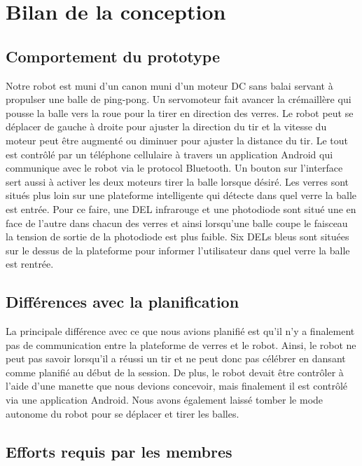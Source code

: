 \section{Bilan de la conception}


\subsection{Comportement du prototype}

Notre robot est muni d’un canon muni d’un moteur DC sans balai servant à propulser une balle de ping-pong.
Un servomoteur fait avancer la crémaillère qui pousse la balle vers la roue pour la tirer en direction des verres.
Le robot peut se déplacer de gauche à droite pour ajuster la direction du tir et la vitesse du moteur peut être augmenté ou diminuer pour ajuster la distance du tir.
Le tout est contrôlé par un téléphone cellulaire à travers un application Android qui communique avec le robot via le protocol Bluetooth.
Un bouton sur l’interface sert aussi à activer les deux moteurs tirer la balle lorsque désiré.
Les verres sont situés plus loin sur une plateforme intelligente qui détecte dans quel verre la balle est entrée.
Pour ce faire, une DEL infrarouge et une photodiode sont situé une en face de l’autre dans chacun des verres et ainsi lorsqu’une balle coupe le faisceau la tension de sortie de la photodiode est plus faible.
Six DELs bleus sont situées sur le dessus de la plateforme pour informer l’utilisateur dans quel verre la balle est rentrée.

\subsection{Différences avec la planification}

La principale différence avec ce que nous avions planifié est qu’il n’y a finalement pas de communication entre la plateforme de verres et le robot.
Ainsi, le robot ne peut pas savoir lorsqu’il a réussi un tir et ne peut donc pas célébrer en dansant comme planifié au début de la session.
De plus, le robot devait être contrôler à l’aide d’une manette que nous devions concevoir, mais finalement il est contrôlé via une application Android.
Nous avons également laissé tomber le mode autonome du robot pour se déplacer et tirer les balles.

\subsection{Efforts requis par les membres}

